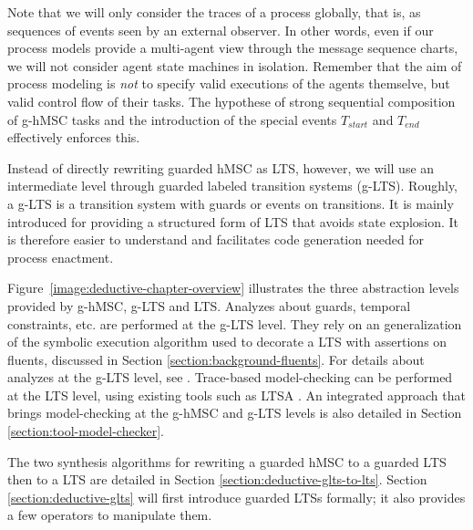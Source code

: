 Note that we will only consider the traces of a process globally, that is, as sequences of events seen by an external observer. In other words, even if our process models provide a multi-agent view through the message sequence charts, we will not consider agent state machines in isolation. Remember that the aim of process modeling is \emph{not} to specify valid executions of the agents themselve, but valid control flow of their tasks. The hypothese of strong sequential composition of g-hMSC tasks and the introduction of the special events $T_{start}$ and $T_{end}$ effectively enforces this.

Instead of directly rewriting guarded hMSC as LTS, however, we will use an intermediate level through guarded labeled transition systems (g-LTS). Roughly, a g-LTS is a transition system with guards or events on transitions. It is mainly introduced for providing a structured form of LTS that avoids state explosion. It is therefore easier to understand and facilitates code generation needed for process enactment. 

Figure~\ref{image:deductive-chapter-overview} illustrates the three abstraction levels provided by g-hMSC, g-LTS and LTS. Analyzes about guards, temporal constraints, etc. are performed at the g-LTS level. They rely on an generalization of the symbolic execution algorithm used to decorate a LTS with assertions on fluents, discussed in Section \ref{section:background-fluents}. For details about analyzes at the g-LTS level, see \cite{Damas:2011}. Trace-based model-checking can be performed at the LTS level, using existing tools such as LTSA \cite{Magee:1999}. An integrated approach that brings model-checking at the g-hMSC and g-LTS levels is also detailed in Section \ref{section:tool-model-checker}.

The two synthesis algorithms for rewriting a guarded hMSC to a guarded LTS then to a LTS are detailed in Section \ref{section:deductive-glts-to-lts}. Section \ref{section:deductive-glts} will first introduce guarded LTSs formally; it also provides a few operators to manipulate them.
